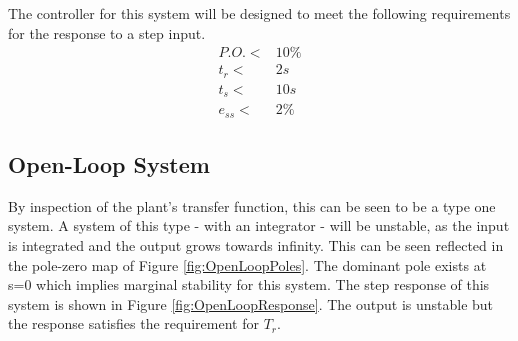 \documentclass{article}
\begin{document}
    The controller for this system will be designed to meet the following requirements for the response to a step input.
    \begin{equation}
        \nonumber
        \begin{aligned}
            P.O.<&10\%\\
            t_r<&2s\\
            t_s<&10s\\
            e_{ss}<&2\%
        \end{aligned}
    \end{equation}
    \subsection{Open-Loop System}
    By inspection of the plant's transfer function, this can be seen to be a type one system.
    A system of this type - with an integrator - will be unstable, as the input is integrated and the output grows towards infinity.
    This can be seen reflected in the pole-zero map of Figure \ref{fig:OpenLoopPoles}. 
    The dominant pole exists at s=0 which implies marginal stability for this system.
    The step response of this system is shown in Figure \ref{fig:OpenLoopResponse}.
    The output is unstable but the response satisfies the requirement for $T_r$.
\end{document}
